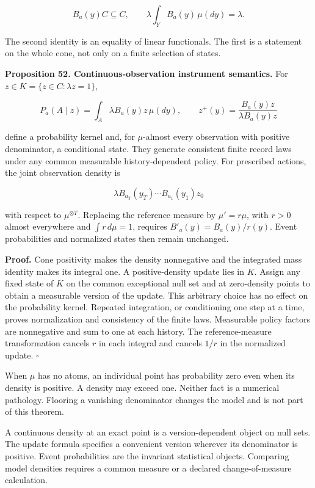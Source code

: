 \[
B_a(y)C\subseteq C,
\qquad
\lambda\int_Y B_a(y)\,\mu(dy)=\lambda.
\]

The second identity is an equality of linear functionals. The first is a
statement on the whole cone, not only on a finite selection of states.

\textbf{Proposition 52. Continuous-observation instrument semantics.}
For \(z\in K=\{z\in C:\lambda z=1\}\),

\[
\boxed{
P_a(A\mid z)=\int_A\lambda B_a(y)z\,\mu(dy),
\qquad
z^+(y)=\frac{B_a(y)z}{\lambda B_a(y)z}
}
\]

define a probability kernel and, for \(\mu\)-almost every observation
with positive denominator, a conditional state. They generate consistent
finite record laws under any common measurable history-dependent policy.
For prescribed actions, the joint observation density is

\[
\lambda B_{a_T}(y_T)\cdots B_{a_1}(y_1)z_0
\]

with respect to \(\mu^{\otimes T}\). Replacing the reference measure by
\(\mu'=r\mu\), with \(r>0\) almost everywhere and \(\int r\,d\mu=1\),
requires \(B'_a(y)=B_a(y)/r(y)\). Event probabilities and normalized
states then remain unchanged.

\textbf{Proof.} Cone positivity makes the density nonnegative and the
integrated mass identity makes its integral one. A positive-density
update lies in \(K\). Assign any fixed state of \(K\) on the common
exceptional null set and at zero-density points to obtain a measurable
version of the update. This arbitrary choice has no effect on the
probability kernel. Repeated integration, or conditioning one step at a
time, proves normalization and consistency of the finite laws.
Measurable policy factors are nonnegative and sum to one at each
history. The reference-measure transformation cancels \(r\) in each
integral and cancels \(1/r\) in the normalized update. \(\square\)

When \(\mu\) has no atoms, an individual point has probability zero even
when its density is positive. A density may exceed one. Neither fact is
a numerical pathology. Flooring a vanishing denominator changes the
model and is not part of this theorem.

A continuous density at an exact point is a version-dependent object on
null sets. The update formula specifies a convenient version wherever
its denominator is positive. Event probabilities are the invariant
statistical objects. Comparing model densities requires a common measure
or a declared change-of-measure calculation.

